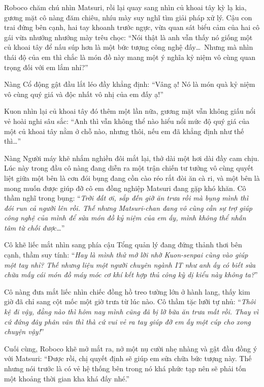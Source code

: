 \documentclass[../main.tex]{subfiles}
\begin{document}
Roboco chăm chú nhìn Matsuri, rồi lại quay sang nhìn củ khoai tây kỳ lạ kia, gương mặt cô nàng đăm chiêu, nhíu mày suy nghĩ tìm giải pháp xử lý. Cậu con trai đứng bên cạnh, hai tay khoanh trước ngực, vừa quan sát biểu cảm của hai cô gái vừa nhướng nhướng mày trêu chọc: ``Nói thật là anh vẫn thấy nó giống một củ khoai tây để nấu súp hơn là một bức tượng công nghệ đấy\dots\ Nhưng mà nhìn thái độ của em thì chắc là món đồ này mang một ý nghĩa kỷ niệm vô cùng quan trọng đối với em lắm nhỉ?''

Nàng Cổ động gật đầu lắt léo đầy khẳng định: ``Vâng ạ! Nó là món quà kỷ niệm vô cùng quý giá và độc nhất vô nhị của em đấy ạ!''

Kuon nhìn lại củ khoai tây đó thêm một lần nữa, gương mặt vẫn không giấu nổi vẻ hoài nghi sâu sắc: ``Anh thì vẫn không thể nào hiểu nổi mức độ quý giá của một củ khoai tây nằm ở chỗ nào, nhưng thôi, nếu em đã khẳng định như thế thì\dots''

Nàng Người máy khẽ nhắm nghiền đôi mắt lại, thở dài một hơi dài đầy cam chịu. Lúc này trong đầu cô nàng đang diễn ra một trận chiến tư tưởng vô cùng quyết liệt giữa một bên là cơn đói bụng đang cồn cào réo rắt đòi ăn cà ri, và một bên là mong muốn được giúp đỡ cô em đồng nghiệp Matsuri đang gặp khó khăn. Cô thầm nghĩ trong bụng: ``\textit{Trời đất ơi, sắp đến giờ ăn trưa rồi mà bụng mình thì đói run cả người lên rồi. Thế nhưng Matsuri-chan đang vô cùng cần sự trợ giúp công nghệ của mình để sửa món đồ kỷ niệm của em ấy, mình không thể nhẫn tâm từ chối được\dots}''

Cô khẽ liếc mắt nhìn sang phía cậu Tổng quản lý đang đứng thảnh thơi bên cạnh, thầm suy tính: ``\textit{Hay là mình thử mở lời nhờ Kuon-senpai cùng vào giúp một tay nhỉ? Thế nhưng liệu một người chuyên ngành IT như anh ấy có biết sửa chữa mấy cái món đồ máy móc cơ khí kết hợp thủ công kỳ dị kiểu này không ta?}''


Cô nàng đưa mắt liếc nhìn chiếc đồng hồ treo tường lớn ở hành lang, thấy kim giờ đã chỉ sang cột mốc một giờ trưa từ lúc nào. Cô thầm tặc lưỡi tự nhủ: ``\textit{Thôi kệ đi vậy, đằng nào thì hôm nay mình cũng đã bị lỡ bữa ăn trưa mất rồi. Thay vì cứ đứng đây phân vân thì thà cứ vui vẻ ra tay giúp đỡ em ấy một cúp cho xong chuyện vậy!}''

Cuối cùng, Roboco khẽ mở mắt ra, nở một nụ cười nhẹ nhàng và gật đầu đồng ý với Matsuri: ``Được rồi, chị quyết định sẽ giúp em sửa chữa bức tượng này. Thế nhưng nói trước là có vẻ hệ thống bên trong nó khá phức tạp nên sẽ phải tốn một khoảng thời gian kha khá đấy nhé.''
\end{document}
